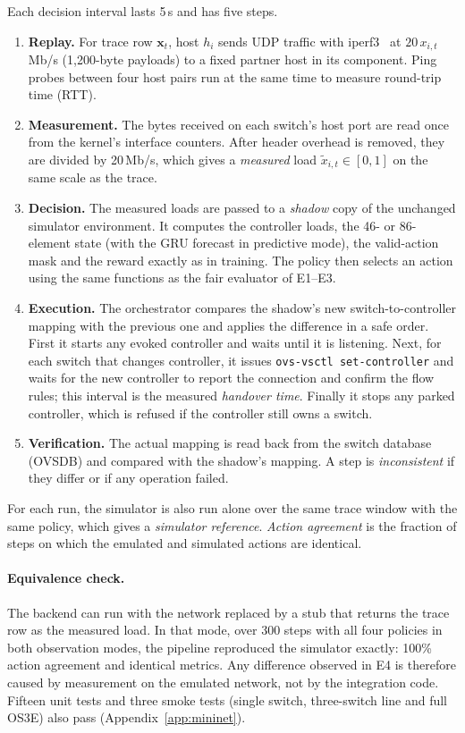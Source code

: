 Each decision interval lasts 5\,s and has five steps.
\begin{enumerate}[leftmargin=*]
  \item \textbf{Replay.} For trace row $\mathbf{x}_t$, host $h_i$ sends UDP traffic with iperf3~\cite{esnet2024iperf3} at $20\,x_{i,t}$\,Mb/s (1,200-byte payloads) to a fixed partner host in its component. Ping probes between four host pairs run at the same time to measure round-trip time (RTT).
  \item \textbf{Measurement.} The bytes received on each switch's host port are read once from the kernel's interface counters. After header overhead is removed, they are divided by 20\,Mb/s, which gives a \emph{measured} load $\tilde{x}_{i,t}\in[0,1]$ on the same scale as the trace.
  \item \textbf{Decision.} The measured loads are passed to a \emph{shadow} copy of the unchanged simulator environment. It computes the controller loads, the 46- or 86-element state (with the GRU forecast in predictive mode), the valid-action mask and the reward exactly as in training. The policy then selects an action using the same functions as the fair evaluator of E1--E3.
  \item \textbf{Execution.} The orchestrator compares the shadow's new switch-to-controller mapping with the previous one and applies the difference in a safe order. First it starts any evoked controller and waits until it is listening. Next, for each switch that changes controller, it issues \texttt{ovs-vsctl set-controller} and waits for the new controller to report the connection and confirm the flow rules; this interval is the measured \emph{handover time}. Finally it stops any parked controller, which is refused if the controller still owns a switch.
  \item \textbf{Verification.} The actual mapping is read back from the switch database (OVSDB) and compared with the shadow's mapping. A step is \emph{inconsistent} if they differ or if any operation failed.
\end{enumerate}

For each run, the simulator is also run alone over the same trace window with the same policy, which gives a \emph{simulator reference}. \emph{Action agreement} is the fraction of steps on which the emulated and simulated actions are identical.

\paragraph{Equivalence check.} The backend can run with the network replaced by a stub that returns the trace row as the measured load. In that mode, over 300 steps with all four policies in both observation modes, the pipeline reproduced the simulator exactly: 100\% action agreement and identical metrics. Any difference observed in E4 is therefore caused by measurement on the emulated network, not by the integration code. Fifteen unit tests and three smoke tests (single switch, three-switch line and full OS3E) also pass (Appendix~\ref{app:mininet}).

